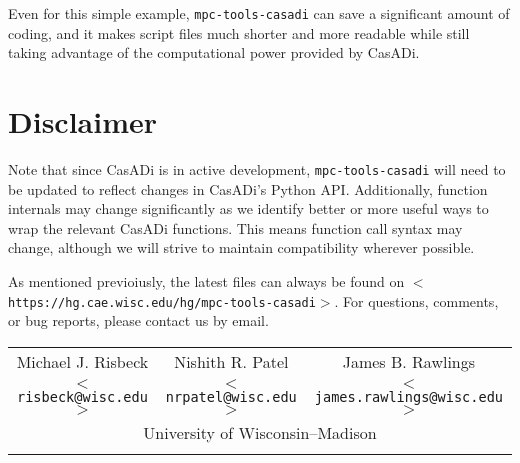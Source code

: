 \documentclass{article}
\newcommand{\smallurl}[2][\scriptsize]{\texttt{#1$<$#2$>$}}
\newcommand{\casadi}{CasADi}
\begin{document}
Even for this simple example, \texttt{mpc-tools-casadi} can save a significant amount of coding, and it makes script files much shorter and more readable while still taking advantage of the computational power provided by \casadi{}.

\section{Disclaimer}

Note that since \casadi{} is in active development, \texttt{mpc-tools-casadi} will need to be updated to reflect changes in \casadi{}'s Python API.
Additionally, function internals may change significantly as we identify better or more useful ways to wrap the relevant \casadi{} functions.
This means function call syntax may change, although we will strive to maintain compatibility wherever possible.

As mentioned previoiusly, the latest files can always be found on \smallurl{https://hg.cae.wisc.edu/hg/mpc-tools-casadi}.
For questions, comments, or bug reports, please contact us by email.

\begin{center}
\begin{tabular}{ccc}
    Michael J. Risbeck & Nishith R. Patel & James B. Rawlings \\
    \smallurl[\small]{risbeck@wisc.edu} & \smallurl[\small]{nrpatel@wisc.edu} & \smallurl[\small]{james.rawlings@wisc.edu} \\
    \multicolumn{3}{c}{University of Wisconsin--Madison} \\
    \hspace*{.2\textwidth} & \hspace*{.2\textwidth} & \hspace*{.2\textwidth} %
\end{tabular}
\end{center}
\end{document}
